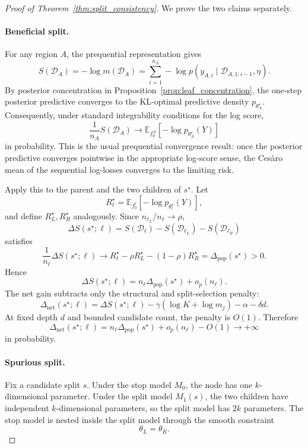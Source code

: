 \begin{proof}[Proof of Theorem~\ref{thm:split_consistency}]
We prove the two claims separately.

\paragraph{Beneficial split.}
For any region $A$, the prequential representation gives
\[
S(\mathcal{D}_A)
=
-\log m(\mathcal{D}_A)
=
\sum_{i=1}^{n_A}
-\log p(y_{A,i}\mid \mathcal{D}_{A,1:i-1},\eta).
\]
By posterior concentration in Proposition~\ref{prop:leaf_concentration}, the one-step posterior predictive converges to the KL-optimal predictive density $p_{\theta_A^\star}$.
Consequently, under standard integrability conditions for the log score,
\[
\frac{1}{n_A}S(\mathcal{D}_A)
\to
\mathbb{E}_{f_0^A}
[-\log p_{\theta_A^\star}(Y)]
\]
in probability. This is the usual prequential convergence result: once the posterior predictive converges pointwise in the appropriate log-score sense, the Cesàro mean of the sequential log-losses converges to the limiting risk.

Apply this to the parent and the two children of $s^\star$.
Let
\[
R_\ell^\star
=
\mathbb{E}_{f_0^\ell}
[-\log p_{\theta_\ell^\star}(Y)],
\]
and define $R_L^\star,R_R^\star$ analogously. Since
$n_{\ell_L}/n_\ell\to\rho$,
\[
\Delta S(s^\star;\ell)
=
S(\mathcal{D}_\ell)
-
S(\mathcal{D}_{\ell_L})
-
S(\mathcal{D}_{\ell_R})
\]
satisfies
\[
\frac{1}{n_\ell}\Delta S(s^\star;\ell)
\to
R_\ell^\star
-
\rho R_L^\star
-
(1-\rho)R_R^\star
=
\Delta_{\mathrm{pop}}(s^\star)
>
0.
\]
Hence
\[
\Delta S(s^\star;\ell)
=
n_\ell\Delta_{\mathrm{pop}}(s^\star)
+
o_p(n_\ell).
\]
The net gain subtracts only the structural and split-selection penalty:
\[
\Delta_{\mathrm{net}}(s^\star;\ell)
=
\Delta S(s^\star;\ell)
-
\gamma(\log K+\log m_j)
-
\alpha
-
\delta d.
\]
At fixed depth $d$ and bounded candidate count, the penalty is $O(1)$.
Therefore
\[
\Delta_{\mathrm{net}}(s^\star;\ell)
=
n_\ell\Delta_{\mathrm{pop}}(s^\star)
+
o_p(n_\ell)
-
O(1)
\to +\infty
\]
in probability.

\paragraph{Spurious split.}
Fix a candidate split $s$.
Under the stop model $M_0$, the node has one $k$-dimensional parameter.
Under the split model $M_1(s)$, the two children have independent $k$-dimensional parameters, so the split model has $2k$ parameters.
The stop model is nested inside the split model through the smooth constraint
\[
\theta_L=\theta_R.
\]


\end{proof}
